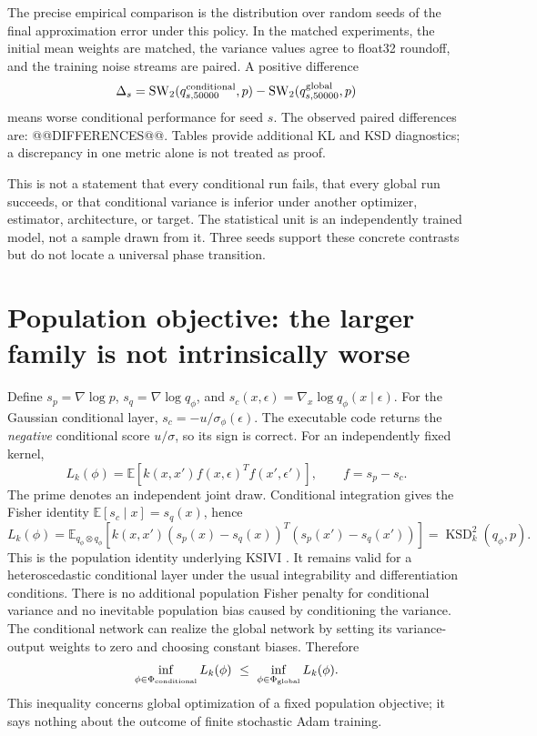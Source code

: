 \documentclass[11pt,a4paper]{article}
\numberwithin{equation}{section}
\newcommand{\E}{\mathbb E}
\begin{document}
The precise empirical comparison is the distribution over random seeds of
the final approximation error under this policy. In the matched experiments,
the initial mean weights are matched, the variance values agree to float32
roundoff, and the training noise streams are paired. A positive difference
\[
 \Delta_s=\mathrm{SW}_2(q^{\rm conditional}_{s,50000},p)
              -\mathrm{SW}_2(q^{\rm global}_{s,50000},p)
\]
means worse conditional performance for seed $s$. The observed paired
differences are: @@DIFFERENCES@@. Tables provide additional KL and KSD
diagnostics; a discrepancy in one metric alone is not treated as proof.

This is not a statement that every conditional run fails, that every global
run succeeds, or that conditional variance is inferior under another optimizer,
estimator, architecture, or target. The statistical unit is an independently
trained model, not a sample drawn from it. Three seeds support these concrete
contrasts but do not locate a universal phase transition.

\section{Population objective: the larger family is not intrinsically worse}
Define $s_p=\nabla\log p$, $s_q=\nabla\log q_\phi$, and
$s_c(x,\epsilon)=\nabla_x\log q_\phi(x\mid\epsilon)$. For the Gaussian
conditional layer, $s_c=-u/\sigma_\phi(\epsilon)$. The executable code returns
the \emph{negative} conditional score $u/\sigma$, so its sign is correct.
For an independently fixed kernel,
\[
 L_k(\phi)=\E[k(x,x')f(x,\epsilon)^T f(x',\epsilon')],\qquad
 f=s_p-s_c.
\]
The prime denotes an independent joint draw. Conditional integration gives
the Fisher identity $\E[s_c\mid x]=s_q(x)$, hence
\[
 L_k(\phi)=\E_{q_\phi\otimes q_\phi}
  [k(x,x')(s_p(x)-s_q(x))^T(s_p(x')-s_q(x'))]
 =\operatorname{KSD}_k^2(q_\phi,p).
\]
This is the population identity underlying KSIVI \cite{cheng}. It remains
valid for a heteroscedastic conditional layer under the usual integrability
and differentiation conditions. There is no additional population Fisher
penalty for conditional variance and no inevitable population bias caused by
conditioning the variance. The conditional network can realize the global
network by setting its variance-output weights to zero and choosing constant
biases. Therefore
\[
 \inf_{\phi\in\Phi_{\rm conditional}}L_k(\phi)
 \ \leq\ \inf_{\phi\in\Phi_{\rm global}}L_k(\phi).
\]
This inequality concerns global optimization of a fixed population objective;
it says nothing about the outcome of finite stochastic Adam training.
\end{document}
